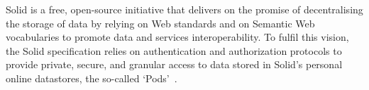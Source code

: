 Solid is a free, open-source initiative that delivers on the promise of decentralising the storage of data by relying on Web standards and on Semantic Web vocabularies to promote data and services interoperability. To fulfil this vision, the Solid specification relies on authentication and authorization protocols to provide private, secure, and granular access to data stored in Solid's personal online datastores, the so-called `Pods'~\citep{mansour_demonstration_2016}.